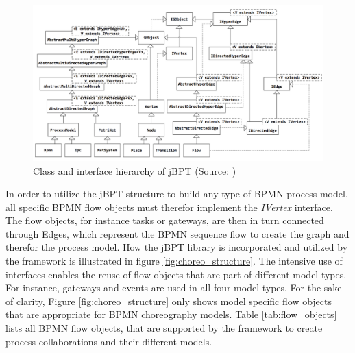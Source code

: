 \begin{figure}[H]
\includegraphics[width=1\textwidth]{src/images/class_diagram_jbpt.png}
\caption{Class and interface hierarchy of jBPT (Source: \cite{jbpt})}
\label{fig:jbpt}
\end{figure}

In order to utilize the jBPT structure to build any type of BPMN process model, all specific BPMN flow objects must therefor implement the \textit{IVertex} interface. The flow objects, for instance tasks or gateways, are then in turn connected through Edges, which represent the BPMN sequence flow to create the graph and therefor the process model. How the jBPT library is incorporated and utilized by the framework is illustrated in figure \ref{fig:choreo_structure}. 
The intensive use of interfaces enables the reuse of flow objects that are part of different model types. For instance, gateways and events are used in all four model types. For the sake of clarity, Figure \ref{fig:choreo_structure} only shows model specific flow objects that are appropriate for BPMN choreography models. Table \ref{tab:flow_objects} lists all BPMN flow objects, that are supported by the framework to create process collaborations and their different models.\\

